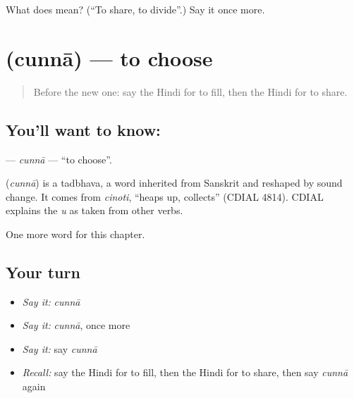 \begin{tcolorbox}[breakable,colback=teal!4,colframe=teal!35!black,title={Before you move on}]
What does  mean? (\textquotedblleft{}To share, to divide\textquotedblright{}.) Say it once more.
\end{tcolorbox}
\section[\texorpdfstring{\hi{चुनना} (cunnā)}{चुनना (cunnā)}]{ (cunnā) — to choose}

\label{lesson:HI-C173-cunna}



\begin{quote}
Before the new one: say the Hindi for to fill, then the Hindi for to share.
\end{quote}

\subsection*{You'll want to know: }
\textbf{} — \emph{cunnā} — \textquotedblleft{}to choose\textquotedblright{}.

\begin{cousinweb}
\textbf{} (\emph{cunnā}) is a tadbhava, a word inherited from Sanskrit and reshaped by sound change. It comes from \emph{cinoti}, \textquotedblleft{}heaps up, collects\textquotedblright{} (CDIAL 4814). CDIAL explains the \emph{u} as taken from other verbs.
\end{cousinweb}

\begin{grammarlens}[title={What you've built}]
One more word for this chapter.
\end{grammarlens}

\subsection*{Your turn}
\begin{itemize}
\raggedright
  \item \emph{Say it:} \emph{cunnā}
  \item \emph{Say it:} \emph{cunnā}, once more
  \item \emph{Say it:} say \emph{cunnā}
  \item \emph{Recall:} say the Hindi for to fill, then the Hindi for to share, then say \emph{cunnā} again
\end{itemize}

